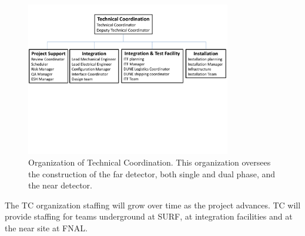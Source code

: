 \begin{figure}[htb]
  \begin{center}
    \includegraphics[width=0.8\textwidth]{far-detector-generic/figures/TP_TC_Org_Chart}
    \caption{Organization of Technical Coordination. This organization
      oversees the construction of the far detector, both single and
      dual phase, and the near detector.}
    \label{fig:TC_orgchart}
  \end{center}
\end{figure}
The TC organization staffing will grow over time as the project
advances. TC will provide staffing for teams underground at SURF, at
integration facilities and at the near site at FNAL.


